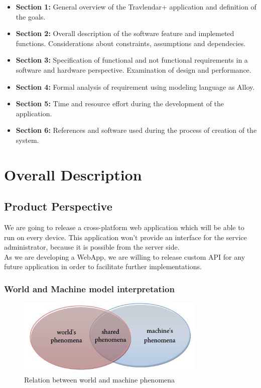 \documentclass[numbers=noenddot, 12pt, a4paper, oneside]{scrbook}
\begin{document}
\begin{itemize}
	\item \textbf{Section 1:} General overview of the Travlendar+ application and definition of the goals.
	\item \textbf{Section 2:} Overall description of the software feature and implemeted functions. Considerations about constraints, assumptions and dependecies.
	\item \textbf{Section 3:} Specification of functional and not functional requirements in a software and hardware perspective. Examination of design and performance.
	\item \textbf{Section 4:} Formal analysis of requirement using modeling language as Alloy.
	\item \textbf{Section 5:} Time and resource effort during the development of the application.
	\item \textbf{Section 6:} References and software used during the process of creation of the system. 
\end{itemize}


\chapter{Overall Description}

\section{Product Perspective}

We are going to release a cross-platform web application which will be able to run on every device. This application won't provide an interface for the service administrator, because it is possible from the server side.\\

As we are developing a WebApp, we are willing to release custom API for any future application in order to facilitate further implementations.\\

\subsection*{World and Machine model interpretation}

\begin{figure}[H]
	\centering
	\includegraphics[width=0.8\textwidth]{phenomena}
	\caption{Relation between world and machine phenomena}
\end{figure}
\end{document}
